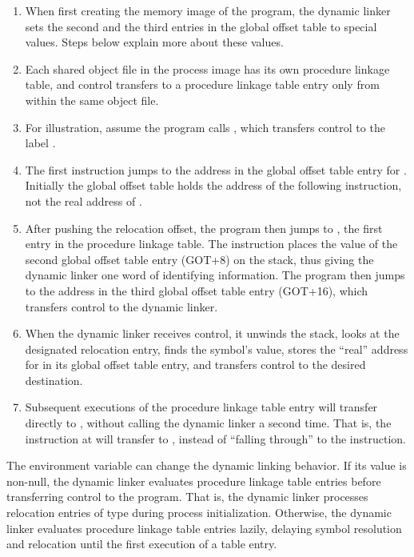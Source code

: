 \begin{enumerate}
\item When first creating the memory image of the program, the dynamic
  linker sets the second and the third entries in the global offset
  table to special values.  Steps below explain more about these
  values.
\item Each shared object file in the process image has its own
  procedure linkage table, and control transfers to a procedure
  linkage table entry only from within the same object file.
\item For illustration, assume the program calls , which
  transfers control to the label .
\item The first instruction jumps to the address in the global offset
  table entry for .  Initially the global offset table
  holds the address of the following  instruction, not the
  real address of .
\item After pushing the relocation offset, the program then jumps to
  , the first entry in the procedure linkage table.  The
   instruction places the value of the second global
  offset table entry (GOT+8) on the stack, thus giving the dynamic
  linker one word of identifying information.  The program then jumps
  to the address in the third global offset table entry (GOT+16),
  which transfers control to the dynamic linker.
\item When the dynamic linker receives control, it unwinds the stack,
  looks at the designated relocation entry, finds the symbol's value,
  stores the ``real'' address for  in its global offset
  table entry, and transfers control to the desired destination.
\item Subsequent executions of the procedure linkage table entry will
  transfer directly to , without calling the dynamic
  linker a second time.  That is, the  instruction at
   will transfer to , instead of ``falling
  through'' to the  instruction.
\end{enumerate}

The  environment variable can change the dynamic
linking behavior.  If its value is non-null, the dynamic linker
evaluates procedure linkage table entries before transferring control
to the program.  That is, the dynamic linker processes relocation
entries of type 
during process initialization.  Otherwise, the dynamic linker
evaluates procedure linkage table entries lazily, delaying symbol
resolution and relocation until the first execution of a table entry.

